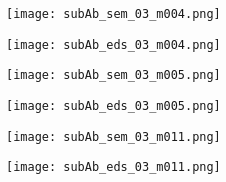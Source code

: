 \begin{figure}
    \centering
    \begin{subfigure}[t]{\textwidth}
          \begin{minipage}[t]{0.43\linewidth}
            \centering
            \texttt{[image: subAb\_sem\_03\_m004.png]}
          \end{minipage}
          \hfill
          \begin{minipage}[t]{0.43\linewidth}
            \centering
            \texttt{[image: subAb\_eds\_03\_m004.png]}
          \end{minipage}
          \begin{minipage}[t]{0.11\linewidth}
            \centering
            \atomicTable[&][&][&]
          \end{minipage}
        \caption{}\label{fig:subAb_silica}
    \end{subfigure}
    \par\bigskip
    \begin{subfigure}[t]{\textwidth}
          \begin{minipage}[t]{0.43\linewidth}
            \centering
            \texttt{[image: subAb\_sem\_03\_m005.png]}
          \end{minipage}
          \hfill
          \begin{minipage}[t]{0.43\linewidth}
            \centering
            \texttt{[image: subAb\_eds\_03\_m005.png]}
          \end{minipage}
          \begin{minipage}[t]{0.11\linewidth}
            \centering
            \atomicTable[&][&][&]
          \end{minipage}
        \caption{}\label{fig:subAb_silica2}
    \end{subfigure}
    \par\bigskip
    \begin{subfigure}[t]{\textwidth}
          \begin{minipage}[t]{0.43\linewidth}
            \centering
            \texttt{[image: subAb\_sem\_03\_m011.png]}
          \end{minipage}
          \hfill
          \begin{minipage}[t]{0.43\linewidth}
            \centering
            \texttt{[image: subAb\_eds\_03\_m011.png]}
          \end{minipage}
          \begin{minipage}[t]{0.11\linewidth}

\end{minipage}
\end{subfigure}
\end{figure}
